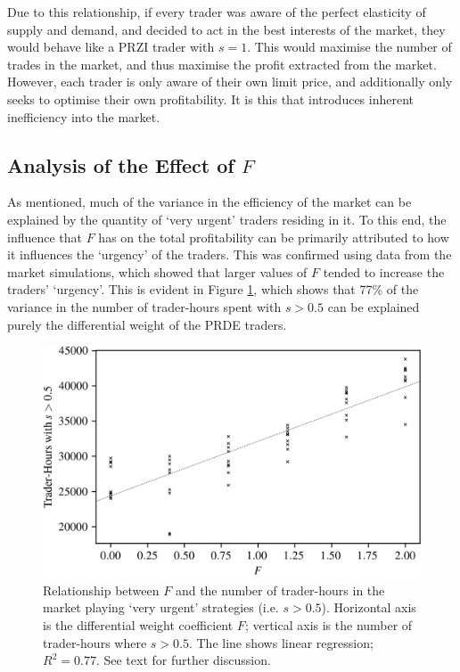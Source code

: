 \documentclass[conference]{IEEEtran}
\begin{document}
Due to this relationship, if every trader was aware of the perfect elasticity of supply and demand, and decided to act in the best interests of the market, they would behave like a PRZI trader with $s=1$.
This would maximise the number of trades in the market, and thus maximise the profit extracted from the market.
However, each trader is only aware of their own limit price, and additionally only seeks to optimise their own profitability.
It is this that introduces inherent inefficiency into the market.

\subsection{Analysis of the Effect of $F$}

As mentioned, much of the variance in the efficiency of the market can be explained by the quantity of `very urgent' traders residing in it.
To this end, the influence that $F$ has on the total profitability can be primarily attributed to how it influences the `urgency' of the traders.
This was confirmed using data from the market simulations, which showed that larger values of $F$ tended to increase the traders' `urgency'.
This is evident in Figure \ref{F_strats}, which shows that 77\% of the variance in the number of trader-hours spent with $s>0.5$ can be explained purely the differential weight of the PRDE traders.

\begin{figure}[htbp]
    \centerline{\includegraphics[width=\columnwidth]{F_strats.png}}
    \caption{
        Relationship between $F$ and the number of trader-hours in the market playing `very urgent' strategies (i.e. $s>0.5$).
        Horizontal axis is the differential weight coefficient $F$; vertical axis is the number of trader-hours where $s>0.5$.
        The line shows linear regression; $R^2=0.77$.
        See text for further discussion.
    }
    \label{F_strats}
\end{figure}
\end{document}
